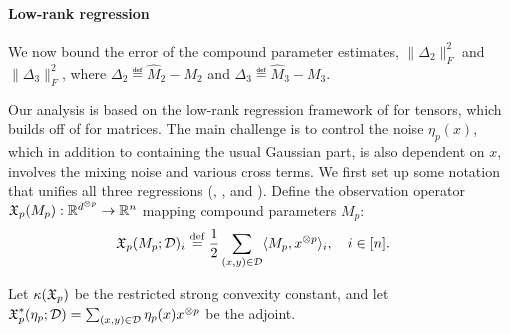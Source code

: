 \paragraph{Low-rank regression}
\vspace{-0.5em}
We now bound the error of
the compound parameter estimates,
$\|\Delta_2\|_F^2$ and $\|\Delta_3\|_F^2$,
where $\Delta_2 \eqdef \hat M_2 - M_2$
and $\Delta_3 \eqdef \hat M_3 - M_3$.

Our analysis is based on the low-rank regression framework of
\citet{Tomioka2011} for tensors, which builds off of
\citet{NegahbanWainwright2009} for matrices.
The main challenge is to control the noise $\eta_p(x)$,
which in addition to containing the usual Gaussian part, is also dependent on
$x$, involves the mixing noise and various cross terms.
We first set up some notation that unifies all three regressions (, , and ).
Define the observation operator $\operatorname{\mathfrak{X}}_p(M_p) : \mathbb{R}^{d^{\otimes p}} \to \mathbb{R}^{n}$
mapping compound parameters $M_p$:
\begin{align}
\operatorname{\mathfrak{X}}_p(M_p; \mathcal{D})_i &\stackrel{\rm def}{=} \frac12 \sum_{(x,y) \in \mathcal{D}} \langle M_p, x^{\otimes p} \rangle_i, \quad i  \in [n].
\end{align}

Let $\kappa(\operatorname{\mathfrak{X}}_p)$ be the restricted strong convexity constant,
and let $\operatorname{\mathfrak{X}}^*_p(\eta_p; \mathcal{D}) = \sum_{(x,y) \in \mathcal{D}} \eta_p(x) x^{\otimes p}$
be the adjoint.





